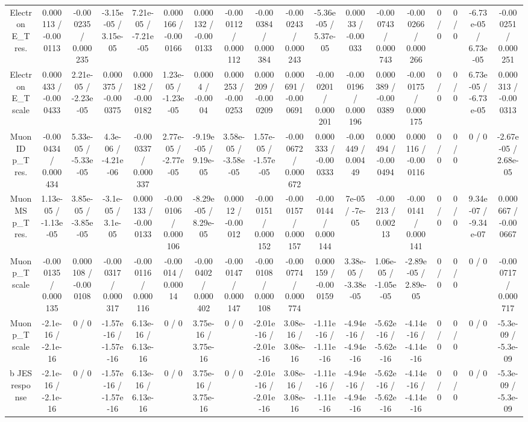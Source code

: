 \documentclass[10pt]{article}
\begin{document}
\begin{table}[htbp]
\begin{center}
\begin{tabular}{|c|c|c|c|c|c|c|c|c|c|c|c|c|c|c|c|c|c|}
  Electron E_{T} res. & 0.000113 / -0.000113 & -0.000235 / 0.000235 & -3.15e-05 / 3.15e-05 & 7.21e-05 / -7.21e-05 & 0.000166 / -0.000166 & 0.000132 / -0.000133 & -0.000112 / 0.000112 & -0.000384 / 0.000384 & -0.000243 / 0.000243 & -5.36e-05 / 5.37e-05 & 0.00033 / -0.00033 & -0.000743 / 0.000743 & -0.000266 / 0.000266 & 0 / 0 & 0 / 0 & -6.73e-05 / 6.73e-05 & -0.000251 / 0.000251 \\ 
  Electron E_{T} scale & 0.000433 / -0.000433 & 2.21e-05 / -2.23e-05 & 0.000375 / -0.000375 & 0.000182 / -0.000182 & 1.23e-05 / -1.23e-05 & 0.0004 / -0.0004 & 0.000253 / -0.000253 & 0.000209 / -0.000209 & 0.000691 / -0.000691 & -0.000201 / 0.000201 & -0.000196 / 0.000196 & 0.000389 / -0.000389 & -0.000175 / 0.000175 & 0 / 0 & 0 / 0 & 6.73e-05 / -6.73e-05 & 0.000313 / -0.000313 \\ 
  Muon ID p_{T} res. & -0.000434 / 0.000434 & 5.33e-05 / -5.33e-05 & 4.3e-06 / -4.21e-06 & -0.000337 / 0.000337 & 2.77e-05 / -2.77e-05 & -9.19e-05 / 9.19e-05 & 3.58e-05 / -3.58e-05 & 1.57e-05 / -1.57e-05 & -0.000672 / 0.000672 & 0.000333 / -0.000333 & -0.00449 / 0.00449 & 0.000494 / -0.000494 & 0.000116 / -0.000116 & 0 / 0 & 0 / 0 & 0 / 0 & -2.67e-05 / 2.68e-05 \\ 
  Muon MS p_{T} res. & 1.13e-05 / -1.13e-05 & 3.85e-05 / -3.85e-05 & -3.1e-05 / 3.1e-05 & 0.000133 / -0.000133 & -0.000106 / 0.000106 & -8.29e-05 / 8.29e-05 & 0.00012 / -0.00012 & -0.000151 / 0.000152 & -0.000157 / 0.000157 & -0.000144 / 0.000144 & 7e-05 / -7e-05 & -0.00213 / 0.00213 & -0.000141 / 0.000141 & 0 / 0 & 0 / 0 & 9.34e-07 / -9.34e-07 & 0.000667 / -0.000667 \\ 
  Muon p_{T} scale & -0.000135 / 0.000135 & 0.000108 / -0.000108 & -0.000317 / 0.000317 & -0.000116 / 0.000116 & -0.00014 / 0.00014 & -0.000402 / 0.000402 & -0.000147 / 0.000147 & -0.000108 / 0.000108 & -0.000774 / 0.000774 & 0.000159 / -0.000159 & 3.38e-05 / -3.38e-05 & 1.06e-05 / -1.05e-05 & -2.89e-05 / 2.89e-05 & 0 / 0 & 0 / 0 & 0 / 0 & -0.000717 / 0.000717 \\ 
  Muon p_{T} scale & -2.1e-16 / -2.1e-16 & 0 / 0 & -1.57e-16 / -1.57e-16 & 6.13e-16 / 6.13e-16 & 0 / 0 & 3.75e-16 / 3.75e-16 & 0 / 0 & -2.01e-16 / -2.01e-16 & 3.08e-16 / 3.08e-16 & -1.11e-16 / -1.11e-16 & -4.94e-16 / -4.94e-16 & -5.62e-16 / -5.62e-16 & -4.14e-16 / -4.14e-16 & 0 / 0 & 0 / 0 & 0 / 0 & -5.3e-09 / -5.3e-09 \\ 
  b JES response & -2.1e-16 / -2.1e-16 & 0 / 0 & -1.57e-16 / -1.57e-16 & 6.13e-16 / 6.13e-16 & 0 / 0 & 3.75e-16 / 3.75e-16 & 0 / 0 & -2.01e-16 / -2.01e-16 & 3.08e-16 / 3.08e-16 & -1.11e-16 / -1.11e-16 & -4.94e-16 / -4.94e-16 & -5.62e-16 / -5.62e-16 & -4.14e-16 / -4.14e-16 & 0 / 0 & 0 / 0 & 0 / 0 & -5.3e-09 / -5.3e-09 \\ 

\end{tabular}
\end{center}
\end{table}
\end{document}
